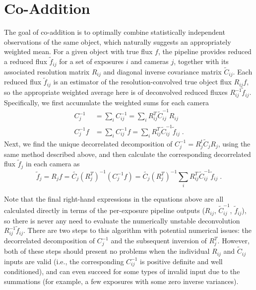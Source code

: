 \documentclass[12pt]{article}
\begin{document}
\section{Co-Addition}

The goal of co-addition is to optimally combine statistically independent observations of the same object, which naturally suggests an appropriately weighted mean. For a given object with true flux $f$, the pipeline provides reduced a reduced flux $\tilde{f}_{ij}$ for a set of exposures $i$ and cameras $j$, together with its associated resolution matrix $R_{ij}$ and diagonal inverse covariance matrix $\tilde{C}_{ij}$. Each reduced flux $\tilde{f}_{ij}$ is an estimator of the resolution-convolved true object flux $R_{ij} f$, so the appropriate weighted average here is of deconvolved reduced fluxes $R_{ij}^{-1} \tilde{f}_{ij}$. Specifically, we first accumulate the weighted sums for each camera
\begin{align}
C_j^{-1} &= \sum_i C_{ij}^{-1} = \sum_i R_{ij}^T \tilde{C}_{ij}^{-1} R_{ij} \\
C_j^{-1}f &= \sum_i C_{ij}^{-1} f = \sum_i R_{ij}^T \tilde{C}_{ij}^{-1} \tilde{f}_{ij} \; .
\end{align}
Next, we find the unique decorrelated decomposition of $C_j^{-1} = R_j^t \tilde{C}_j R_j$, using the same method described above, and then calculate the corresponding decorrelated flux $\tilde{f}_j$ in each camera as
\begin{equation}
\tilde{f}_j = R_j f = \tilde{C_j} (R_j^T)^{-1} \left( C_j^{-1}f \right)
= \tilde{C_j} (R_j^T)^{-1} \sum_i R_{ij}^T \tilde{C}_{ij}^{-1} \tilde{f}_{ij}\; .
\end{equation}

Note that the final right-hand expressions in the equations above are all calculated directly in terms of the per-exposure pipeline outputs ($R_{ij}$, $\tilde{C}_{ij}^{-1}$, $\tilde{f}_{ij}$), so there is never any need to evaluate the numerically unstable deconvolution $R_{ij}^{-1} \tilde{f}_{ij}$. There are two steps to this algorithm with potential numerical issues: the decorrelated decomposition of $C_j^{-1}$ and the subsequent inversion of $R_j^T$. However, both of these steps should present no problems when the individual $R_{ij}$ and $\tilde{C}_{ij}$ inputs are valid (i.e., the corresponding $C_{ij}^{-1}$ is positive definite and well conditioned), and can even succeed for some types of invalid input due to the summations (for example, a few exposures with some zero inverse variances).
\end{document}
